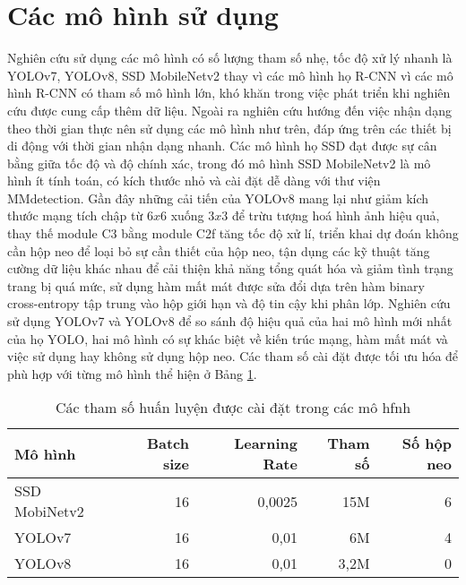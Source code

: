 \documentclass[../the.tex]{subfiles}
\begin{document}
\section{Các mô hình sử dụng}
\label{sec:model}


{\fontsize{13}{12} \selectfont

	Nghiên cứu sử dụng các mô hình có số lượng tham số nhẹ, tốc độ xử lý nhanh là YOLOv7, YOLOv8, SSD MobileNetv2 thay vì các mô hình họ R-CNN vì các mô hình R-CNN có tham số mô hình lớn, khó khăn trong việc phát triển khi nghiên cứu được cung cấp thêm dữ liệu.
	Ngoài ra nghiên cứu hướng đến việc nhận dạng theo thời gian thực nên sử dụng các mô hình như trên, đáp ứng trên các thiết bị di động với thời gian nhận dạng nhanh.
	Các mô hình họ SSD đạt được sự cân bằng giữa tốc độ và độ chính xác, trong đó mô hình
	SSD MobileNetv2 là mô hình ít tính toán, có kích thước nhỏ và cài đặt dễ dàng với thư viện MMdetection.
	Gần đây những cải tiến của YOLOv8 mang lại như giảm kích thước mạng tích chập từ $6x6$ xuống $3x3$ để trừu tượng hoá hình ảnh hiệu quả, thay thế module C3 bằng module C2f tăng tốc độ xử lí, triển khai dự đoán không cần hộp neo để loại bỏ sự cần thiết của hộp neo,
	tận dụng các kỹ thuật tăng cường dữ liệu khác nhau để cải thiện khả năng tổng quát hóa và giảm tình trạng trang bị quá mức, sử dụng hàm mất mát được sửa đổi dựa trên hàm binary cross-entropy tập trung vào hộp giới hạn và độ tin cậy khi phân lớp.
	Nghiên cứu sử dụng YOLOv7 và YOLOv8 để so sánh độ hiệu quả của hai mô hình mới nhất của họ YOLO, hai mô hình có sự khác biệt về kiến trúc mạng, hàm mất mát và việc sử dụng hay không sử dụng hộp neo.
	Các tham số cài đặt được tối ưu hóa để phù hợp với từng mô hình thể hiện ở Bảng \ref{tab:caidat}.

}


\begin{table}[H]
	\centering
	\begin{threeparttable}
		\caption{Các tham số huấn luyện được cài đặt trong các mô hfnh}

		\begin{tabular}{lrrrr}
			\hline
			\textbf{Mô hình} & \textbf{Batch size} & \textbf{Learning Rate} & \textbf{Tham số} & \textbf{Số hộp neo} \\ \hline
			SSD MobiNetv2    & 16                  & 0,0025                  & 15M              & 6                   \\ \hline
			YOLOv7           & 16                  & 0,01                   & 6M               & 4                   \\ \hline
			YOLOv8           & 16                  & 0,01                   & 3,2M             & 0                   \\ \hline
		\end{tabular}
		\label{tab:caidat}
	\end{threeparttable}
\end{table}
\end{document}

